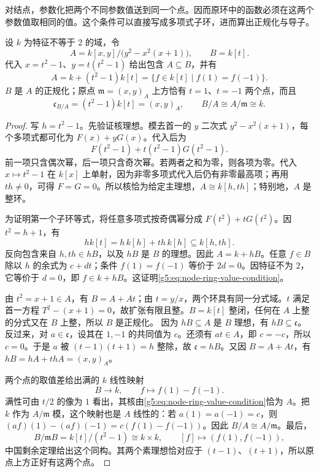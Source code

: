 对结点，参数化把两个不同参数值送到同一个点。因而原环中的函数必须在这两个参数值取相同的值。这个条件可以直接写成多项式子环，进而算出正规化与导子。

\begin{example}\label{g5:exm:node-conductor}
	设 \(k\) 为特征不等于 \(2\) 的域，令
	\[
	A=k[x,y]/\bigl(y^2-x^2(x+1)\bigr),\qquad B=k[t].
	\]
	代入 \(x=t^2-1\)、\(y=t(t^2-1)\) 给出包含 \(A\subseteq B\)，并有
	\begin{equation}\label{g5:eq:node-ring-value-condition}
	A=k+(t^2-1)k[t]
	=\{f\in k[t]\mid f(1)=f(-1)\}.
	\end{equation}
	\(B\) 是 \(A\) 的正规化；原点 \(\mathfrak m=(x,y)_A\) 上方恰有 \(t=1\)、\(t=-1\) 两个点，而且
	\[
	\mathfrak c_{B/A}=(t^2-1)k[t]=(x,y)_A,
	\qquad B/A\cong A/\mathfrak m\cong k.
	\]
\end{example}
\begin{proof}
	写 \(h=t^2-1\)。先验证核理想。模去首一的 \(y\) 二次式 \(y^2-x^2(x+1)\)，每个多项式都可化为 \(F(x)+yG(x)\)。代入后为
	\[
	F(t^2-1)+t(t^2-1)G(t^2-1).
	\]
	前一项只含偶次幂，后一项只含奇次幂。若两者之和为零，则各项为零。代入 \(x\mapsto t^2-1\) 在 \(k[x]\) 上单射，因为非零多项式代入后仍有非零最高项；再用 \(th\ne0\)，可得 \(F=G=0\)。所以核恰为给定主理想，\(A\cong k[h,th]\)；特别地，\(A\) 是整环。

	为证明第一个子环等式，将任意多项式按奇偶幂分成
	\(F(t^2)+tG(t^2)\)。因 \(t^2=h+1\)，有
	\[
	hk[t]=h\,k[h]+th\,k[h]\subseteq k[h,th].
	\]
	反向包含来自 \(h,th\in hB\)，以及 \(hB\) 是 \(B\) 的理想。因此 \(A=k+hB\)。任意 \(f\in B\) 除以 \(h\) 的余式为 \(c+dt\)；条件 \(f(1)=f(-1)\) 等价于 \(2d=0\)。因特征不为 \(2\)，它等价于 \(d=0\)，即 \(f\in k+hB\)。这证明\eqref{g5:eq:node-ring-value-condition}。

	由 \(t^2=x+1\in A\)，有 \(B=A+At\)；由 \(t=y/x\)，两个环具有同一分式域。\(t\) 满足首一方程 \(T^2-(x+1)=0\)，故扩张有限且整。\(B=k[t]\) 整闭，任何在 \(A\) 上整的分式又在 \(B\) 上整，所以 \(B\) 是正规化。
	因为 \(hB\subseteq A\) 是 \(B\) 理想，有 \(hB\subseteq\mathfrak c\)。反过来，对 \(a\in\mathfrak c\)，设其在 \(1,-1\) 的共同值为 \(c\)。还须有 \(at\in A\)，即 \(c=-c\)，所以 \(c=0\)。于是 \(a\) 被 \((t-1)(t+1)=h\) 整除，故 \(\mathfrak c=hB\)。又因 \(B=A+At\)，有 \(hB=hA+thA=(x,y)_A\)。

	两个点的取值差给出满的 \(k\) 线性映射
	\[
	B\longrightarrow k,\qquad f\longmapsto f(1)-f(-1).
	\]
	满性可由 \(t/2\) 的像为 \(1\) 看出，其核由\eqref{g5:eq:node-ring-value-condition}恰为 \(A\)。把 \(k\) 作为 \(A/\mathfrak m\) 模，这个映射也是 \(A\) 线性的：若 \(a(1)=a(-1)=c\)，则 \((af)(1)-(af)(-1)=c(f(1)-f(-1))\)。因此 \(B/A\cong A/\mathfrak m\)。最后，
	\[
	B/\mathfrak mB=k[t]/(t^2-1)\cong k\times k,
	\qquad [f]\longmapsto(f(1),f(-1)),
	\]
	中国剩余定理给出这个同构。其两个素理想恰对应于 \((t-1)\)、\((t+1)\)，所以原点上方正好有这两个点。
\end{proof}

